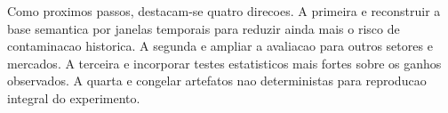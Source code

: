 \documentclass[12pt]{article}
\begin{document}
Como proximos passos, destacam-se quatro direcoes. A primeira e reconstruir a base semantica por janelas temporais para reduzir ainda mais o risco de contaminacao historica. A segunda e ampliar a avaliacao para outros setores e mercados. A terceira e incorporar testes estatisticos mais fortes sobre os ganhos observados. A quarta e congelar artefatos nao deterministas para reproducao integral do experimento.



\end{document}
